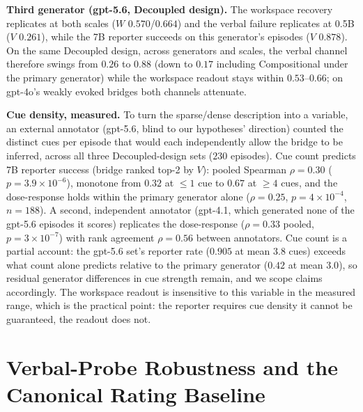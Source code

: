 \textbf{Third generator (gpt-5.6, Decoupled design).} The workspace recovery
replicates at both scales ($W$ $0.570$/$0.664$) and the verbal failure
replicates at 0.5B ($V$ $0.261$), while the 7B reporter succeeds on this
generator's episodes ($V$ $0.878$). On the same Decoupled design, across
generators and scales, the verbal channel therefore swings from $0.26$ to
$0.88$ (down to $0.17$ including Compositional under the primary generator)
while the workspace readout stays within $0.53$--$0.66$; on gpt-4o's weakly
evoked bridges both channels attenuate.

\textbf{Cue density, measured.} To turn the sparse/dense description into a
variable, an external annotator (gpt-5.6, blind to our hypotheses' direction)
counted the distinct cues per episode that would each independently allow the
bridge to be inferred, across all three Decoupled-design sets ($230$
episodes). Cue count predicts 7B reporter success (bridge ranked top-2 by
$V$): pooled Spearman $\rho{=}0.30$ ($p{=}3.9\times10^{-6}$), monotone from
$0.32$ at ${\le}1$ cue to $0.67$ at ${\ge}4$ cues, and the dose-response
holds within the primary generator alone ($\rho{=}0.25$,
$p{=}4\times10^{-4}$, $n{=}188$). A second, independent annotator (gpt-4.1, which generated none of the
gpt-5.6 episodes it scores) replicates the dose-response ($\rho{=}0.33$
pooled, $p{=}3\times10^{-7}$) with rank agreement $\rho{=}0.56$ between
annotators. Cue count is a partial account: the gpt-5.6 set's reporter rate
($0.905$ at mean $3.8$ cues) exceeds what count alone predicts relative to
the primary generator ($0.42$ at mean $3.0$), so residual generator
differences in cue strength remain, and we scope claims accordingly. The workspace readout is insensitive to this variable in the
measured range, which is the practical point: the reporter requires cue
density it cannot be guaranteed, the readout does not.



\section{Verbal-Probe Robustness and the Canonical Rating Baseline}
\label{app:vrobust}

